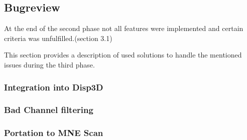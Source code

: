 \subsection{Bugreview}
At the end of the second phase not all features were implemented and certain criteria was unfulfilled.(section 3.1)

This section provides a description of used solutions to handle the mentioned issues during the third phase.

\subsubsection{Integration into Disp3D}


\subsubsection{Bad Channel filtering}

\subsubsection{Portation to MNE Scan}


